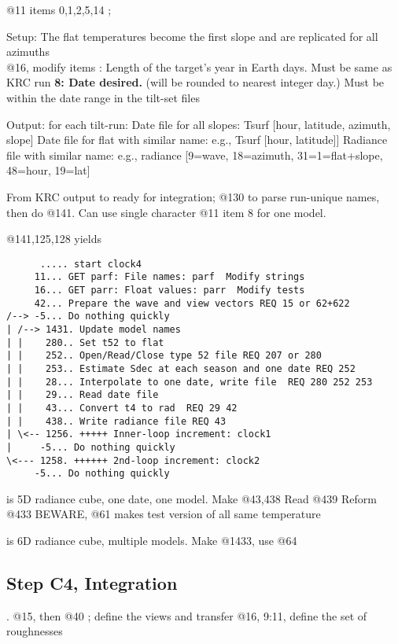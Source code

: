 \documentclass{article}
\newcommand{\qln}{\tiny \setlength{\baselineskip}{4.pt} \setlength{\parskip}{0.5pt} } %
\newcommand{\qnl}{\normalsize \setlength{\baselineskip}{12.pt} \setlength{\parskip}{4.3pt}} %
\begin{document}
@11 items 0,1,2,5,14 ; 

Setup:
\qii The flat temperatures become the first slope and  are replicated for all azimuths
\\ @16, modify items 
: Length of the target's year in Earth days. Must be same as KRC run
\qi \textbf{8: Date desired.} (will be rounded to nearest integer day.) 
\qii Must be within the date range in the tilt-set files 

Output: for each tilt-run: 
\qii Date file for all slopes: 
\qiii Tsurf [hour, latitude, azimuth, slope]
\qii Date file for flat with similar name: e.g., 
\qiii Tsurf [hour, latitude]]
\qii Radiance file with similar name: e.g., 
\qiii radiance [9=wave, 18=azimuth, 31=1=flat+slope, 48=hour, 19=lat]

From KRC output to ready for integration; @130 to parse run-unique
names, then do @141. Can use single character @11 item 8 for one model.

@141,125,128 yields
\begin{verbatim}
      ..... start clock4
     11... GET parf: File names: parf  Modify strings
     16... GET parr: Float values: parr  Modify tests
     42... Prepare the wave and view vectors REQ 15 or 62+622
/--> -5... Do nothing quickly
| /--> 1431. Update model names
| |    280.. Set t52 to flat
| |    252.. Open/Read/Close type 52 file REQ 207 or 280
| |    253.. Estimate Sdec at each season and one date REQ 252
| |    28... Interpolate to one date, write file  REQ 280 252 253
| |    29... Read date file
| |    43... Convert t4 to rad  REQ 29 42
| |    438.. Write radiance file REQ 43
| \<-- 1256. +++++ Inner-loop increment: clock1
|     -5... Do nothing quickly
\<--- 1258. ++++++ 2nd-loop increment: clock2
     -5... Do nothing quickly
\end{verbatim}

\qln %
 is 5D radiance cube, one date, one model.  Make @43,438  Read @439  Reform @433
\qi BEWARE, @61 makes test version of all same temperature

 is 6D radiance cube, multiple models. Make @1433, use @64

\qnl %


\subsection{Step C4, Integration} %
.
\qi @15, then @40  ; define the views and transfer
\qi @16, 9:11, define the set of roughnesses
\end{document}

